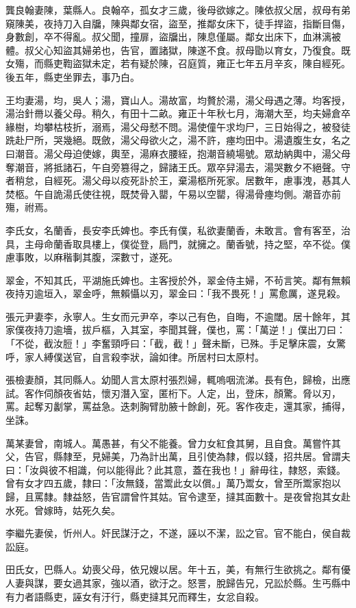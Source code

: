 \begin{pinyinscope}
龔良翰妻陳，葉縣人。良翰卒，孤女才三歲，後母欲嫁之。陳依叔父居，叔母有弟窺陳美，夜持刀入自牖，陳與鄰女宿，盜至，推鄰女床下，徒手捍盜，指斷目傷，身數創，卒不得亂。叔父聞，撞扉，盜牖出，陳息僅屬。鄰女出床下，血淋漓被體。叔父心知盜其婦弟也，告官，置諸獄，陳遂不食。叔母勖以育女，乃復食。既女殤，而縣吏鞫盜獄未定，若有疑於陳，召庭質，雍正七年五月辛亥，陳自經死。後五年，縣吏坐罪去，事乃白。

王均妻湯，均，吳人；湯，寶山人。湯故富，均贅於湯，湯父母遇之薄。均客授，湯治針黹以養父母。稍久，有田十二畝。雍正十年秋七月，海潮大至，均夫婦倉卒緣樹，均攀枯枝折，溺焉，湯父母憖不問。湯使僮午求均尸，三日始得之，被發徒跣赴尸所，哭幾絕。既斂，湯父母欲火之，湯不許，瘞均田中。湯遺腹生女，名之曰潮音。湯父母迫使嫁，輿至，湯麻衣腰絰，抱潮音繞場號。眾劫納輿中，湯父母奪潮音，將抵諸石，午自旁篡得之，歸諸王氏。眾卒舁湯去，湯哭數夕不絕聲。守者稍怠，自經死。湯父母以疫死訃於王，棄湯柩所死家。居數年，慮事洩，惎其人焚柩。午自詭湯氏使往視，既焚骨入罌，午易以空罌，得湯骨瘞均側。潮音亦前殤，祔焉。

李氏女，名蘭香，長安李氏婢也。李氏有僕，私欲妻蘭香，未敢言。會有客至，治具，主母命蘭香取具樓上，僕從登，扃門，就擁之。蘭香號，持之堅，卒不從。僕慮事敗，以麻稭剚其腹，深數寸，遂死。

翠金，不知其氏，平湖施氏婢也。主客授於外，翠金侍主婦，不茍言笑。鄰有無賴夜持刃逾垣入，翠金呼，無賴懾以刃，翠金曰：「我不畏死！」罵愈厲，遂見殺。

張元尹妻李，永寧人。生女而元尹卒，李以己有色，自晦，不逾閾。居十餘年，其家僕夜持刀逾墻，拔戶樞，入其室，李聞其聲，僕也，罵：「萬逆！」僕出刀曰：「不從，截汝脰！」李奮頸呼曰：「截，截！」聲未斷，已殊。手足擊床震，女驚呼，家人縛僕送官，自言殺李狀，論如律。所居村曰太原村。

張檢妻顏，其同縣人。幼聞人言太原村張烈婦，輒嗚咽流涕。長有色，歸檢，出應試。客作伺顏夜省姑，懷刃潛入室，匿桁下。人定，出，登床，顏驚。脅以刃，罵。起奪刃劙掌，罵益急。迭刺胸臂肋腋十餘創，死。客作夜走，還其家，捕得，坐誅。

萬某妻曾，南城人。萬愚甚，有父不能養。曾力女紅食其舅，且自食。萬嘗忤其父，告官，縣隸至，見婦美，乃為計出萬，且引使為隸，假以錢，招共居。曾謂夫曰：「汝與彼不相識，何以能得此？此其意，蓋在我也！」辭毋往，隸怒，索錢。曾有女才四五歲，隸曰：「汝無錢，當鬻此女以償。」萬乃鬻女，曾至所鬻家抱以歸，且罵隸。隸益怒，告官謂曾忤其姑。官令逮至，撻其面數十。是夜曾抱其女赴水死。曾嫁時，姑死久矣。

李繼先妻侯，忻州人。奸民謀汙之，不遂，誣以不潔，訟之官。官不能白，侯自裁訟庭。

田氏女，巴縣人。幼喪父母，依兄嫂以居。年十五，美，有無行生欲挑之。鄰有優人妻與謀，要女過其家，強以酒，欲汙之。怒詈，脫歸告兄，兄訟於縣。生丐縣中有力者語縣吏，誣女有汙行，縣吏撻其兄而釋生，女忿自殺。


\end{pinyinscope}

